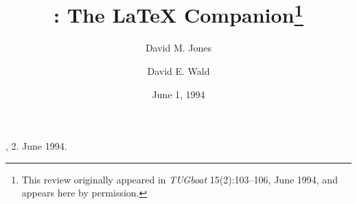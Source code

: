 
, 2.
\issdate June 1994.

\setcounter{page}{1}
\PrelimDraftfalse

\def\LaTeXe{\LaTeX{}\kern.05em2$_{\textstyle\varepsilon}$}

\title{\Review: The \LaTeX{} Companion\thanks{This review originally
appeared in {\sl TUGboat\/} 15(2):103--106, June 1994, and appears
here by permission.}}

\author{David M. Jones}

\address{MIT Laboratory for Computer Science\\
545 Technology Square\\
Cambridge, MA 02139}


\author{David E. Wald}

\address{MIT Laboratory for Computer Science\\
545 Technology Square\\
Cambridge, MA 02139}


\date{June 1, 1994}



